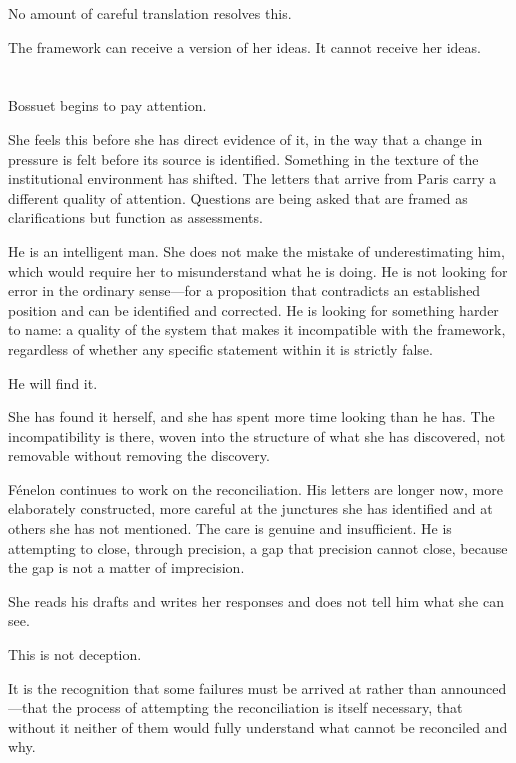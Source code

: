 No amount of careful translation resolves this.

The framework can receive a version of her ideas. It
cannot receive her ideas.

\section{}

Bossuet begins to pay attention.

She feels this before she has direct evidence of it, in
the way that a change in pressure is felt before its
source is identified. Something in the texture of the
institutional environment has shifted. The letters that
arrive from Paris carry a different quality of attention.
Questions are being asked that are framed as clarifications
but function as assessments.

He is an intelligent man. She does not make the mistake
of underestimating him, which would require her to
misunderstand what he is doing. He is not looking for
error in the ordinary sense---for a proposition that
contradicts an established position and can be identified
and corrected. He is looking for something harder to
name: a quality of the system that makes it incompatible
with the framework, regardless of whether any specific
statement within it is strictly false.

He will find it.

She has found it herself, and she has spent more time
looking than he has. The incompatibility is there, woven
into the structure of what she has discovered, not
removable without removing the discovery.

Fénelon continues to work on the reconciliation. His
letters are longer now, more elaborately constructed,
more careful at the junctures she has identified and at
others she has not mentioned. The care is genuine and
insufficient. He is attempting to close, through
precision, a gap that precision cannot close, because
the gap is not a matter of imprecision.

She reads his drafts and writes her responses and does
not tell him what she can see.

This is not deception.

It is the recognition that some failures must be arrived
at rather than announced---that the process of attempting
the reconciliation is itself necessary, that without it
neither of them would fully understand what cannot be
reconciled and why.

